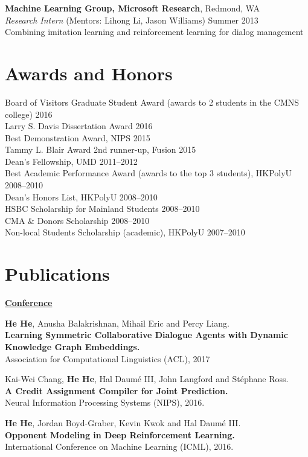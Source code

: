 \documentclass[margin,line]{resume}
\begin{document}
\begin{resume}
{\bf Machine Learning Group, Microsoft Research}, Redmond, WA\\
\emph{Research Intern} (Mentors: Lihong Li, Jason Williams) \hfill Summer 2013\\
Combining imitation learning and reinforcement learning for dialog management 

\section{\sc Awards and Honors}
Board of Visitors Graduate Student Award (awards to 2 students in the CMNS college) \hfill 2016\\
Larry S. Davis Dissertation Award \hfill 2016\\
Best Demonstration Award, NIPS \hfill 2015\\
Tammy L. Blair Award 2nd runner-up, Fusion \hfill 2015\\
Dean's Fellowship, UMD \hfill 2011--2012 \\
Best Academic Performance Award (awards to the top 3 students), HKPolyU \hfill 2008--2010\\
Dean's Honors List, HKPolyU \hfill 2008--2010\\
HSBC Scholarship for Mainland Students \hfill 2008--2010\\
CMA \& Donors Scholarship \hfill 2008--2010\\
Non-local Students Scholarship (academic), HKPolyU \hfill 2007--2010\\

\section{\sc Publications}
{\bf\underline{Conference}}

{\bf He He}, Anusha Balakrishnan, Mihail Eric and Percy Liang.\\
{\bf Learning Symmetric Collaborative Dialogue Agents with Dynamic Knowledge Graph Embeddings.}\\
Association for Computational Linguistics (ACL), 2017

Kai-Wei Chang, {\bf He He}, Hal Daum\'e III, John Langford and St\'ephane Ross.\\
{\bf A Credit Assignment Compiler for Joint Prediction.}\\
Neural Information Processing Systems (NIPS), 2016. 

{\bf He He}, Jordan Boyd-Graber, Kevin Kwok and Hal Daum\'e III.\\
{\bf Opponent Modeling in Deep Reinforcement Learning.}\\
International Conference on Machine Learning (ICML), 2016.


\end{resume}
\end{document}
